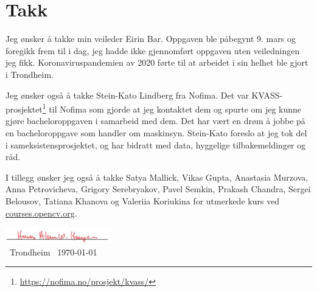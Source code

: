 \section*{Takk}

Jeg ønsker å takke min veileder Eirin Bar. Oppgaven ble påbegynt 9. mars og foregikk frem til i dag, jeg hadde ikke gjennomført oppgaven uten veiledningen jeg fikk. Koronaviruspandemien av 2020 førte til at arbeidet i sin helhet ble gjort i Trondheim.

Jeg ønsker også å takke Stein-Kato Lindberg fra Nofima. Det var KVASS-prosjektet\footnote{\url{https://nofima.no/prosjekt/kvass/}} til Nofima som gjorde at jeg kontaktet dem og spurte om jeg kunne gjøre bacheloroppgaven i samarbeid med dem. Det har vært en drøm å jobbe på en bacheloroppgave som handler om maskinsyn. Stein-Kato foreslo at jeg tok del i sameksistensprosjektet, og har bidratt med data, hyggelige tilbakemeldinger og råd.

I tillegg ønsker jeg også å takke Satya Mallick, Vikas Gupta, Anastasia Murzova, Anna Petrovicheva, Grigory Serebryakov, Pavel Semkin, Prakash Chandra, Sergei Belousov, Tatiana Khanova og Valeriia Koriukina for utmerkede kurs ved \url{courses.opencv.org}.

\begin{flushright} 
\includegraphics{figures/underskrift}\\ \ Trondheim \ \today
\end{flushright} 


